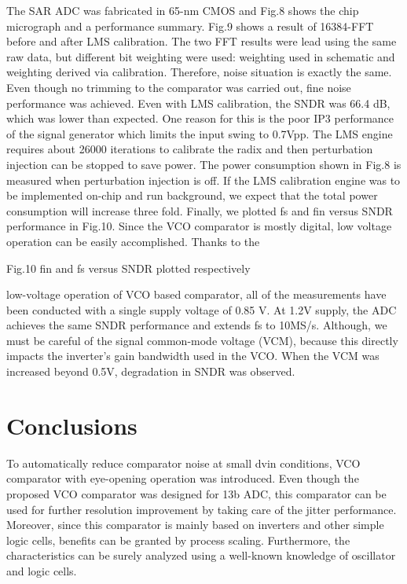 \documentclass[letterpaper, 10 pt, conference]{ieeeconf}  %
\begin{document}
The SAR ADC was fabricated in 65-nm CMOS and Fig.8 shows the chip micrograph and a performance summary. 
Fig.9 shows a result of 16384-FFT before and after LMS calibration. The two FFT results were lead using the same raw data, but different bit weighting were used: weighting used in schematic and weighting derived via calibration. Therefore, noise situation is exactly the same. Even though no trimming to the comparator was carried out, fine noise performance was achieved. Even with LMS calibration, the SNDR was 66.4 dB, which was lower than expected. One reason for this is the poor IP3 performance of the signal generator which limits the input swing to 0.7Vpp.  The LMS engine requires about 26000 iterations to calibrate the radix and then perturbation injection can be stopped to save power. The power consumption shown in Fig.8 is measured when perturbation injection is off. If the LMS calibration engine was to be implemented on-chip and run background, we expect that the total power consumption will increase three fold.
Finally, we plotted fs and fin versus SNDR performance in Fig.10. Since the VCO comparator is mostly digital, low voltage operation can be easily accomplished.  Thanks to the 
 
Fig.10 fin and fs versus SNDR plotted respectively

low-voltage operation of VCO based comparator, all of the measurements have been conducted with a single supply voltage of 0.85 V. At 1.2V supply, the ADC achieves the same SNDR performance and extends fs to 10MS/s. Although, we must be careful of the signal common-mode voltage (VCM), because this directly impacts the inverter’s gain bandwidth used in the VCO. When the VCM was increased beyond 0.5V, degradation in SNDR was observed.


\section{Conclusions}
To automatically reduce comparator noise at small dvin conditions, VCO comparator with eye-opening operation was introduced.  Even though the proposed VCO comparator was designed for 13b ADC, this comparator can be used for further resolution improvement by taking care of the jitter performance. Moreover, since this comparator is mainly based on inverters and other simple logic cells, benefits can be granted by process scaling. Furthermore, the characteristics can be surely analyzed using a well-known knowledge of oscillator and logic cells. 




\end{document}
